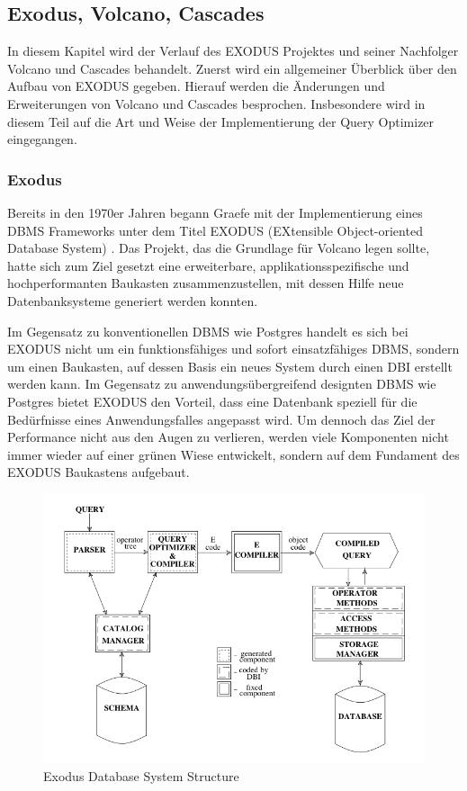 \subsection{Exodus, Volcano, Cascades}

In diesem Kapitel wird der Verlauf des EXODUS Projektes und seiner Nachfolger Volcano und Cascades behandelt. Zuerst wird ein allgemeiner Überblick über den Aufbau von EXODUS gegeben. Hierauf werden die Änderungen und Erweiterungen von Volcano und Cascades besprochen. Insbesondere wird in diesem Teil auf die Art und Weise der Implementierung der Query Optimizer eingegangen. 

\subsubsection{Exodus}


Bereits in den 1970er Jahren begann Graefe mit der Implementierung eines DBMS Frameworks unter dem Titel EXODUS (EXtensible Object-oriented Database System) \cite{carey1990exodus}. Das Projekt, das die Grundlage für Volcano legen sollte, hatte sich zum Ziel gesetzt eine erweiterbare, applikationsspezifische und hochperformanten Baukasten zusammenzustellen, mit dessen Hilfe neue Datenbanksysteme generiert werden konnten. 

Im Gegensatz zu konventionellen DBMS wie Postgres handelt es sich bei EXODUS nicht um ein funktionsfähiges und sofort einsatzfähiges DBMS, sondern um einen Baukasten, auf dessen Basis ein neues System durch einen DBI erstellt werden kann. Im Gegensatz zu anwendungsübergreifend designten DBMS wie Postgres bietet EXODUS den Vorteil, dass eine Datenbank speziell für die Bedürfnisse eines Anwendungsfalles angepasst wird. Um dennoch das Ziel der Performance nicht aus den Augen zu verlieren, werden viele Komponenten nicht immer wieder auf einer grünen Wiese entwickelt, sondern auf dem Fundament des EXODUS Baukastens aufgebaut.

\begin{figure}[h]
  \centering
  \includegraphics[width=\textwidth]{02_Grundlagen/ExodusDatabaseSystemStructure.png}
  \caption{Exodus Database System Structure}
\end{figure}

